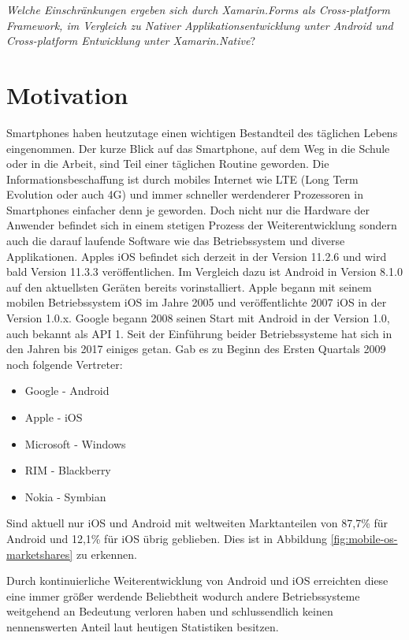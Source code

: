 	\textit{Welche Einschränkungen ergeben sich durch Xamarin.Forms als Cross-platform Framework, im Vergleich zu Nativer Applikationsentwicklung unter Android und Cross-platform Entwicklung unter Xamarin.Native}?

\section{Motivation}
\label{sec:motivation}

	Smartphones haben heutzutage einen wichtigen Bestandteil des täglichen Lebens eingenommen. Der kurze Blick auf das Smartphone, auf dem Weg in die Schule oder in die Arbeit, sind Teil einer täglichen Routine geworden. Die Informationsbeschaffung ist durch mobiles Internet wie LTE (Long Term Evolution oder auch 4G) und immer schneller werdenderer Prozessoren in Smartphones einfacher denn je geworden. Doch nicht nur die Hardware der Anwender befindet sich in einem stetigen Prozess der Weiterentwicklung sondern auch die darauf laufende Software wie das Betriebssystem und diverse Applikationen. Apples iOS befindet sich derzeit in der Version 11.2.6 und wird bald Version 11.3.3 veröffentlichen. Im Vergleich dazu ist Android in Version 8.1.0 auf den aktuellsten Geräten bereits vorinstalliert. Apple begann mit seinem mobilen Betriebssystem iOS im Jahre 2005 und veröffentlichte 2007 iOS in der Version 1.0.x. Google begann 2008 seinen Start mit Android in der Version 1.0, auch bekannt als API 1. Seit der Einführung beider Betriebssysteme hat sich in den Jahren bis 2017 einiges getan. Gab es zu Beginn des Ersten Quartals 2009 noch folgende Vertreter:
	\begin{itemize}
		\setlength\itemsep{0em}
		\item Google - Android
		\item Apple - iOS
		\item Microsoft - Windows
		\item RIM - Blackberry
		\item Nokia - Symbian
	\end{itemize}

	Sind aktuell nur iOS und Android mit weltweiten Marktanteilen von 87,7\% für Android und 12,1\% für iOS übrig geblieben. Dies ist in Abbildung \ref{fig:mobile-os-marketshares} zu erkennen.

	Durch kontinuierliche Weiterentwicklung von Android und iOS erreichten diese eine immer größer werdende Beliebtheit wodurch andere Betriebssysteme weitgehend an Bedeutung verloren haben und schlussendlich keinen nennenswerten Anteil laut heutigen Statistiken besitzen.

